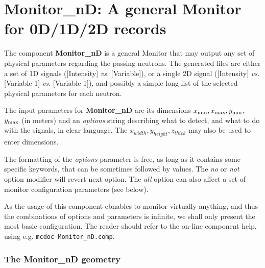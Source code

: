 \section{Monitor\_nD: A general Monitor for 0D/1D/2D records}
\label{s:monitornd}


The component {\bf Monitor\_nD} is a general Monitor that may output any
set of physical parameters regarding the passing neutrons. The
generated files are either a set of 1D signals ([Intensity] {\it vs.}
[Variable]), or a single 2D signal ([Intensity] {\it vs.} [Variable 1]
{\it vs.} [Variable 1]), and possibly a simple long list of the selected
physical parameters for each neutron.

The input parameters for {\bf Monitor\_nD} are its dimensions $x_{\rm
  min}, x_{\rm max}, y_{\rm min}$, $y_{\rm max}$ (in meters) and an {\it
  options} string describing what to detect, and what to do with the
signals, in clear language. The $x_{width}, y_{height}, z_{thick}$ may also be used to enter dimensions.

The formatting of the {\it options}
parameter is free, as long as it contains some specific keywords, that
can be sometimes followed by values. The {\it no} or {\it not} option
modifier will revert next option. The {\it all} option can also affect a
set of monitor configuration parameters (see below).

As the usage of this component ebnables to monitor virtually anything, and thus the combinations of options and parameters is infinite, we shall only present the most basic configuration. The reader should refer to the on-line component help, using e.g. \verb+mcdoc Monitor_nD.comp+.

\subsubsection{The Monitor\_nD geometry}

